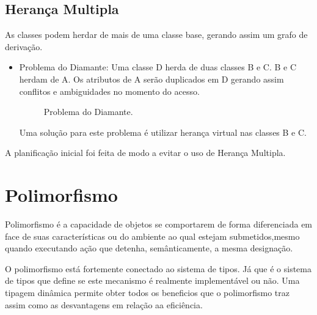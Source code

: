\documentclass[rel_mlp]{iiufrgs}
\newcommand{\fonte}[1]{\\Fonte: {#1}}
\begin{document}
\subsection{Herança Multipla} 	
As classes podem herdar de mais de uma classe base, gerando assim um grafo de derivação.
 \begin{itemize}
   \item Problema do Diamante: Uma classe D herda de duas classes B e C. B e C herdam de A. Os atributos de A serão duplicados em D gerando   assim conflitos e ambiguidades no momento do acesso. 
\begin{figure}[htb]
    \centering
    \label{fig:figura3}
    \caption{Problema do Diamante.}
\end{figure}
   
   
   
   Uma solução para este problema  é utilizar herança virtual nas classes B e C.
 \end{itemize}  	
 A planificação inicial foi feita de modo a evitar o uso de Herança Multipla.

\section{Polimorfismo}
Polimorfismo é a capacidade de objetos se comportarem de forma diferenciada em face de suas características ou do ambiente ao qual estejam submetidos,mesmo quando executando ação que detenha, semânticamente, a mesma designação.

O polimorfismo está fortemente conectado ao sistema de tipos. Já que é o sistema de tipos que define se este mecanismo é realmente implementável ou não.  Uma tipagem dinâmica permite obter todos os beneficios que o polimorfismo traz assim como as desvantagens em relação aa eficiência. 
\end{document}
